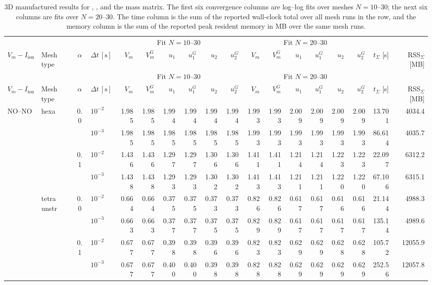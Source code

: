 \tiny
\setlength{\tabcolsep}{1.7pt}
\begin{longtable}{llclrrrrrrrrrrrrrr}
\caption{3D manufactured results for , , and the  mass matrix. The first six convergence columns are log--log fits over meshes $N=10$--$30$; the next six columns are fits over $N=20$--$30$. The time column is the sum of the reported wall-clock total over all mesh runs in the row, and the memory column is the sum of the reported peak resident memory in MB over the same mesh runs.}\label{tab:results-3d-picard-cn-cons}\\
\toprule
& & & & \multicolumn{6}{c}{Fit $N=10$--$30$} & \multicolumn{6}{c}{Fit $N=20$--$30$} & & \\
\cmidrule(lr){5-10}\cmidrule(lr){11-16}
$V_m-I_{\mathrm{ion}}$ & Mesh type & $\alpha$ & $\Delta t\,[\text{s}]$ & $V_m$ & $V_m^G$ & $u_1$ & $u_1^G$ & $u_2$ & $u_2^G$ & $V_m$ & $V_m^G$ & $u_1$ & $u_1^G$ & $u_2$ & $u_2^G$ & $t_{\Sigma}$ [s] & RSS$_{\Sigma}$ [MB] \\
\midrule
\endfirsthead
\toprule
& & & & \multicolumn{6}{c}{Fit $N=10$--$30$} & \multicolumn{6}{c}{Fit $N=20$--$30$} & & \\
\cmidrule(lr){5-10}\cmidrule(lr){11-16}
$V_m-I_{\mathrm{ion}}$ & Mesh type & $\alpha$ & $\Delta t\,[\text{s}]$ & $V_m$ & $V_m^G$ & $u_1$ & $u_1^G$ & $u_2$ & $u_2^G$ & $V_m$ & $V_m^G$ & $u_1$ & $u_1^G$ & $u_2$ & $u_2^G$ & $t_{\Sigma}$ [s] & RSS$_{\Sigma}$ [MB] \\
\midrule
\endhead
\multirow{8}{*}{NO--NO} & \multirow{4}{*}{hexa} & \multirow{2}{*}{0.0} & $10^{-2}$ & 1.985 & 1.985 & 1.994 & 1.994 & 1.994 & 1.994 & 1.993 & 1.993 & 2.009 & 2.009 & 2.009 & 2.009 & 13.701 & 4034.4 \\
& & & $10^{-3}$ & 1.985 & 1.985 & 1.985 & 1.985 & 1.985 & 1.985 & 1.993 & 1.993 & 1.993 & 1.993 & 1.993 & 1.993 & 86.614 & 4035.7 \\\cline{3-18}
& & \multirow{2}{*}{0.1} & $10^{-2}$ & 1.436 & 1.436 & 1.297 & 1.297 & 1.306 & 1.306 & 1.411 & 1.411 & 1.214 & 1.214 & 1.223 & 1.223 & 22.097 & 6312.2 \\
& & & $10^{-3}$ & 1.438 & 1.438 & 1.293 & 1.293 & 1.302 & 1.302 & 1.413 & 1.413 & 1.211 & 1.211 & 1.220 & 1.220 & 67.106 & 6315.1 \\\cline{2-18}
& \multirow{4}{*}{tetra unstr} & \multirow{2}{*}{0.0} & $10^{-2}$ & 0.664 & 0.664 & 0.375 & 0.375 & 0.373 & 0.373 & 0.826 & 0.826 & 0.617 & 0.617 & 0.616 & 0.616 & 21.144 & 4988.3 \\
& & & $10^{-3}$ & 0.663 & 0.663 & 0.377 & 0.377 & 0.375 & 0.375 & 0.829 & 0.829 & 0.617 & 0.617 & 0.617 & 0.617 & 135.14 & 4989.6 \\\cline{3-18}
& & \multirow{2}{*}{0.1} & $10^{-2}$ & 0.677 & 0.677 & 0.398 & 0.398 & 0.396 & 0.396 & 0.823 & 0.823 & 0.629 & 0.629 & 0.628 & 0.628 & 105.72 & 12055.9 \\
& & & $10^{-3}$ & 0.677 & 0.677 & 0.400 & 0.400 & 0.398 & 0.398 & 0.828 & 0.828 & 0.629 & 0.629 & 0.629 & 0.629 & 252.56 & 12057.8 \\\hline


\end{longtable}
